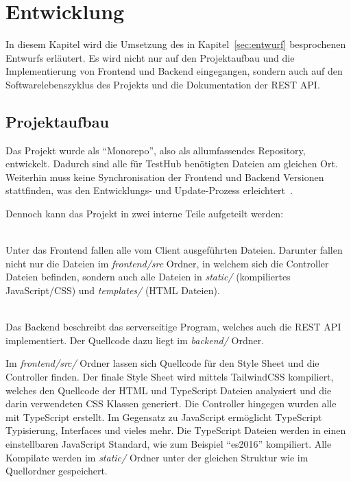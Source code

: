 \section{Entwicklung}
In diesem Kapitel wird die Umsetzung des in Kapitel~\ref{sec:entwurf} besprochenen
Entwurfs erläutert. Es wird nicht nur auf den Projektaufbau und die Implementierung 
von \gls{Frontend} und \gls{Backend} eingegangen, sondern auch auf den 
Softwarelebenszyklus des Projekts und die Dokumentation der \gls{REST} \gls{API}.

\subsection{Projektaufbau}
Das Projekt wurde als ``Monorepo'', also als allumfassendes Repository, entwickelt.
Dadurch sind alle für TestHub benötigten Dateien am gleichen Ort. Weiterhin muss 
keine Synchronisation der Frontend und Backend Versionen stattfinden, was den
Entwicklungs- und Update-Prozess erleichtert~\cite{PL16}.

Dennoch kann das Projekt in zwei interne Teile aufgeteilt werden:

\begin{description}
    \hfill\\
    Unter das Frontend fallen alle vom Client ausgeführten Dateien. Darunter
    fallen nicht nur die Dateien im \textit{frontend/src} Ordner, in welchem sich die 
    Controller Dateien befinden, sondern auch alle Dateien in \textit{static/} (kompiliertes JavaScript/CSS) 
    und \textit{templates/} (HTML Dateien).

    \hfill\\
    Das Backend beschreibt das serverseitige Program, welches auch die \gls{REST} \gls{API}
    implementiert. Der Quellcode dazu liegt im \textit{backend/} Ordner.
\end{description}

Im \textit{frontend/src/} Ordner lassen sich Quellcode für den Style Sheet und 
die Controller finden. Der finale Style Sheet wird mittels TailwindCSS
kompiliert, welches den Quellcode der HTML und TypeScript Dateien analysiert und
die darin verwendeten \gls{CSS} Klassen generiert. Die Controller hingegen wurden alle mit 
TypeScript erstellt. Im Gegensatz zu 
JavaScript ermöglicht TypeScript Typisierung, Interfaces und vieles mehr. Die TypeScript Dateien 
werden in einen einstellbaren JavaScript Standard, wie zum Beispiel ``es2016''
kompiliert. Alle Kompilate werden im \textit{static/} Ordner unter der gleichen 
Struktur wie im Quellordner gespeichert.

